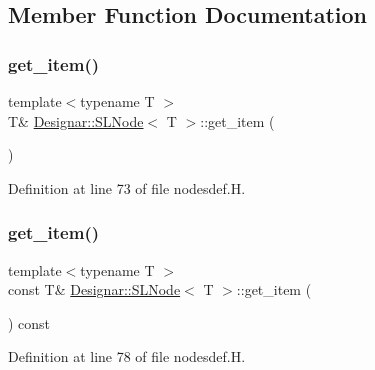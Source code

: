 \subsection{Member Function Documentation}
\mbox{\label{class_designar_1_1_s_l_node_a8b1b374efe3c861930b24515fb15d243}} 
\subsubsection{\texorpdfstring{get\+\_\+item()}{get\_item()}\hspace{0.1cm}{\footnotesize\ttfamily [1/2]}}
{\footnotesize\ttfamily template$<$typename T $>$ \\
T\& \hyperlink{class_designar_1_1_s_l_node}{Designar\+::\+S\+L\+Node}$<$ T $>$\+::get\+\_\+item (\begin{DoxyParamCaption}{ }\end{DoxyParamCaption})\hspace{0.3cm}{\ttfamily [inline]}}



Definition at line 73 of file nodesdef.\+H.

\mbox{\label{class_designar_1_1_s_l_node_a3bda4e61a77ff2df2096850759605257}} 
\subsubsection{\texorpdfstring{get\+\_\+item()}{get\_item()}\hspace{0.1cm}{\footnotesize\ttfamily [2/2]}}
{\footnotesize\ttfamily template$<$typename T $>$ \\
const T\& \hyperlink{class_designar_1_1_s_l_node}{Designar\+::\+S\+L\+Node}$<$ T $>$\+::get\+\_\+item (\begin{DoxyParamCaption}{ }\end{DoxyParamCaption}) const\hspace{0.3cm}{\ttfamily [inline]}}



Definition at line 78 of file nodesdef.\+H.

